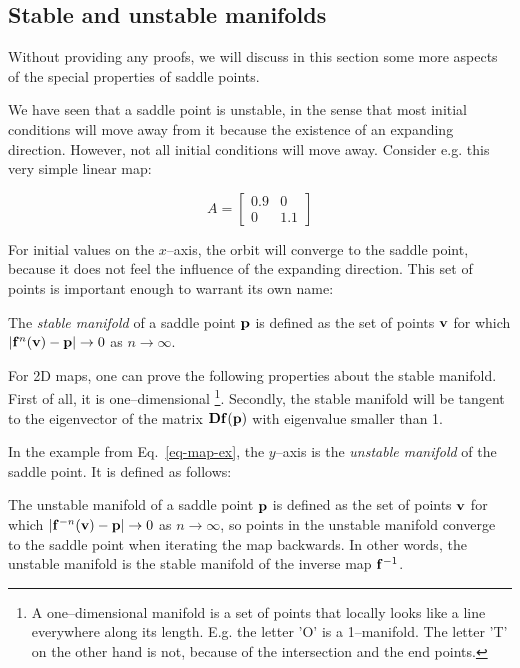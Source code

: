 \subsection{Stable and unstable manifolds}

Without providing any proofs, we will discuss in this section some more aspects of the special properties of saddle points.

We have seen that a saddle point is unstable, in the sense that most initial conditions will move away from it because the existence of an expanding direction. However, not all initial conditions will move away. Consider e.g. this very simple linear map:

\begin{equation}
A =
\begin{bmatrix}
0.9 & 0 \\
0 & 1.1
\end{bmatrix} 
\label{eq-map-ex}
\end{equation} 

For initial values on the $x$--axis, the orbit will converge to the saddle point, because it does not feel the influence of the expanding direction. This set of points is important enough to warrant its own name:

The \emph{stable manifold} of a saddle point ${\bf p}$ is defined as the set of points ${\bf v}$ for which $|{\bf f}^n({\bf v}) - {\bf p} | \to 0$ as $ n \to \infty$.

For 2D maps, one can prove the following properties about the stable manifold. First of all, it is one--dimensional \footnote{A one--dimensional manifold is a set of points that locally looks like a line everywhere along its length. E.g. the letter 'O' is a 1--manifold. The letter 'T' on the other hand is not, because of the intersection and the end points.}. Secondly, the stable manifold will be tangent to the eigenvector of the matrix ${\bf Df}({\bf p})$ with eigenvalue smaller than 1.

In the example from Eq.~\ref{eq-map-ex}, the $y$--axis is the \emph{unstable manifold} of the saddle point. It is defined as follows:

The unstable manifold of a saddle point ${\bf p}$ is defined as the set of points ${\bf v}$ for which $|{\bf f}^{-n}({\bf v}) - {\bf p}| \to 0$ as $ n \to \infty$, so points in the unstable manifold converge to the saddle point when iterating the map backwards. In other words, the unstable manifold is the stable manifold of the inverse map ${\bf f}^{-1}$.


